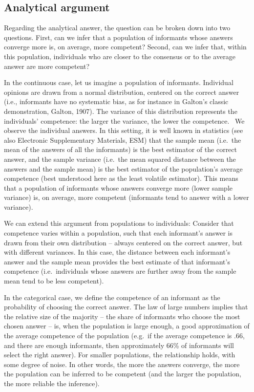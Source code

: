 \documentclass[
  doc,floatsintext]{apa6}
\begin{document}
\subsection{Analytical argument}\label{analytical-argument}

Regarding the analytical answer, the question can be broken down into two questions. First, can we infer that a population of informants whose answers converge more is, on average, more competent? Second, can we infer that, within this population, individuals who are closer to the consensus or to the average answer are more competent?

In the continuous case, let us imagine a population of informants. Individual opinions are drawn from a normal distribution, centered on the correct answer (i.e., informants have no systematic bias, as for instance in Galton's classic demonstration, Galton, 1907). The variance of this distribution represents the individuals' competence: the larger the variance, the lower the competence.~ We observe the individual answers. In this setting, it is well known in statistics (see also Electronic Supplementary Materials, ESM) that the sample mean (i.e.~the mean of the answers of all the informants) is the best estimator of the correct answer, and the sample variance (i.e.~the mean squared distance between the answers and the sample mean) is the best estimator of the population's average competence (best understood here as the least volatile estimator). This means that a population of informants whose answers converge more (lower sample variance) is, on average, more competent (informants tend to answer with a lower variance).

We can extend this argument from populations to individuals: Consider that competence varies within a population, such that each informant's answer is drawn from their own distribution -- always centered on the correct answer, but with different variances. In this case, the distance between each informant's answer and the sample mean provides the best estimate of that informant's competence (i.e.~individuals whose answers are further away from the sample mean tend to be less competent).

In the categorical case, we define the competence of an informant as the probability of choosing the correct answer. The law of large numbers implies that the relative size of the majority -- the share of informants who choose the most chosen answer -- is, when the population is large enough, a good approximation of the average competence of the population (e.g.~if the average competence is .66, and there are enough informants, then approximately 66\% of informants will select the right answer). For smaller populations, the relationship holds, with some degree of noise. In other words, the more the answers converge, the more the population can be inferred to be competent (and the larger the population, the more reliable the inference).
\end{document}
